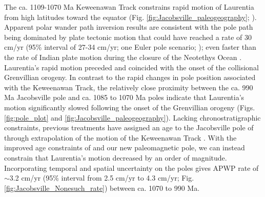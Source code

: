 The ca. 1109-1070 Ma Keweenawan Track constrains rapid motion of Laurentia from high latitudes toward the equator (Fig. \ref{fig:Jacobsville_paleogeography}; \citealp{Davis1997a, Swanson-Hysell2019a}). Apparent polar wander path inversion results are consistent with the pole path being dominated by plate tectonic motion that could have reached a rate of 30 cm/yr (95\% interval of 27-34 cm/yr; one Euler pole scenario; \citealp{Swanson-Hysell2019a, Rose2022a}); even faster than the rate of Indian plate motion during the closure of the Neotethys Ocean \citep{Hinsbergen2022a, Jagoutz2015a}. Laurentia's rapid motion preceded and coincided with the onset of the collisional Grenvillian orogeny. In contrast to the rapid changes in pole position associated with the Keweenawan Track, the relatively close proximity between the ca. 990 Ma Jacobsville pole and ca. 1085 to 1070 Ma poles indicate that Laurentia's motion significantly slowed following the onset of the Grenvillian orogeny (Figs. \ref{fig:pole_plot} and \ref{fig:Jacobsville_paleogeography}). Lacking chronostratigraphic constraints, previous treatments have assigned an age to the Jacobsville pole of \cite{Roy1978a} through extrapolation of the motion of the Keweenawan Track \cite[e.g.][]{Li2008a}. With the improved age constraints of \cite{Hodgin2022a} and our new paleomagnetic pole, we can instead constrain that Laurentia's motion decreased by an order of magnitude. Incorporating temporal and spatial uncertainty on the poles gives APWP rate of $\sim$3.2 cm/yr (95\% interval from 2.5 cm/yr to 4.3 cm/yr; Fig. \ref{fig:Jacobsville_Nonesuch_rate}) between ca. 1070 to 990 Ma.  

